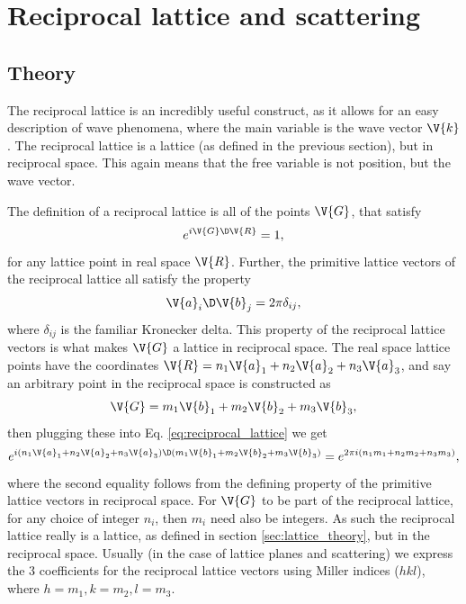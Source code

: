 \documentclass[main.tex]{subfiles}
\begin{document}
	\section{Reciprocal lattice and scattering} \label{sec:scattering}
	\subsection{Theory}
	The reciprocal lattice is an incredibly useful construct, as it allows for an easy description of wave phenomena, where the main variable is the wave vector $ \V{k} $. The reciprocal lattice is a lattice (as defined in the previous section), but in reciprocal space. This again means that the free variable is not position, but the wave vector.
	
	The definition of a reciprocal lattice is all of the points $ \V{G} $, that satisfy
	\begin{equation}\label{eq:reciprocal_lattice}
		e^{i \V{G} \D \V{R}} = 1,
	\end{equation}
	for any lattice point in real space $ \V{R} $. Further, the primitive lattice vectors of the reciprocal lattice all satisfy the property \cite{kittel}
	\begin{equation}\label{eq:rec_prim_def}
		\V{a}_i \D \V{b}_j = 2\pi \delta_{ij},
	\end{equation}
	where $ \delta_{ij} $ is the familiar Kronecker delta. This property of the reciprocal lattice vectors is what makes $ \V{G} $ a lattice in reciprocal space. The real space lattice points have the coordinates $ \V{R} = n_1 \V{a}_1 + n_2 \V{a}_2 + n_3 \V{a}_3 $, and say an arbitrary point in the reciprocal space is constructed as
	\begin{equation}\label{eq:rec_lat_vec}
		\V{G} = m_1 \V{b}_1 + m_2 \V{b}_2 + m_3 \V{b}_3,
	\end{equation}
	then plugging these into Eq. \eqref{eq:reciprocal_lattice} we get
	\begin{equation}
		e^{i (n_1 \V{a}_1 + n_2 \V{a}_2 + n_3 \V{a}_3) \D (m_1 \V{b}_1 + m_2 \V{b}_2 + m_3 \V{b}_3)} = e^{2\pi i (n_1 m_1 + n_2 m_2 + n_3 m_3)},
	\end{equation}
	where the second equality follows from the defining property of the primitive lattice vectors in reciprocal space. For $ \V{G} $ to be part of the reciprocal lattice, for any choice of integer $ n_i $, then $ m_i $ need also be integers. As such the reciprocal lattice really is a lattice, as defined in section \ref{sec:lattice_theory}, but in the reciprocal space. Usually (in the case of lattice planes and scattering) we express the 3 coefficients for the reciprocal lattice vectors using Miller indices ($ hkl $), where $ h=m_1, k=m_2, l=m_3 $.
	
\end{document}
